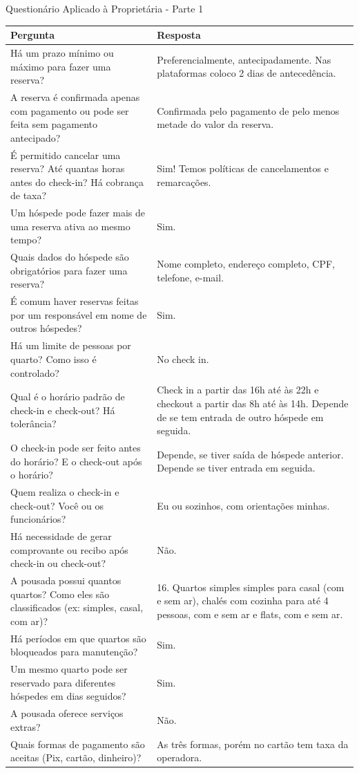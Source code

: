\documentclass[
	12pt,				%
	openany,			%
	twoside,			%
	a4paper,			%
	english,			%
	french,				%
	spanish,			%
	brazil				%
	]{abntex2}
\begin{document}
\begin{quadro}[H]
	\caption{Questionário Aplicado à Proprietária - Parte 1}
	 \label{questionario_1}
	  \begin{tabular}{|p{7.5cm}|p{7.5cm}|}
		\hline
		\textbf{Pergunta} & \textbf{Resposta}  \\ \hline
		Há um prazo mínimo ou máximo para fazer uma reserva? & Preferencialmente, antecipadamente. Nas plataformas coloco 2 dias de antecedência. 
		\\ \hline
		A reserva é confirmada apenas com pagamento ou pode ser feita sem pagamento antecipado? &
		Confirmada pelo pagamento de pelo menos metade do valor da reserva.
		\\ \hline
		É permitido cancelar uma reserva? Até quantas horas antes do check-in? Há cobrança de taxa? &
		Sim!  Temos políticas de cancelamentos e remarcações.
		\\ \hline
		Um hóspede pode fazer mais de uma reserva ativa ao mesmo tempo? &	Sim.
		\\ \hline
		Quais dados do hóspede são obrigatórios para fazer uma reserva? &
		Nome completo, endereço completo,  CPF, telefone, e-mail.
		\\ \hline
		É comum haver reservas feitas por um responsável em nome de outros hóspedes? &
		Sim.
		\\ \hline
		Há um limite de pessoas por quarto? Como isso é controlado? & No check in.
		\\ \hline
		Qual é o horário padrão de check-in e check-out? Há tolerância? &
		Check in a partir das 16h até às 22h e checkout a partir das 8h até às 14h.  Depende de se tem entrada de outro hóspede em seguida.
		\\ \hline
		O check-in pode ser feito antes do horário? E o check-out após o horário? &
		Depende, se tiver saída de hóspede anterior.  Depende se tiver entrada em seguida.
		\\ \hline
		Quem realiza o check-in e check-out? Você ou os funcionários? &
		Eu ou sozinhos, com orientações minhas. 
		\\ \hline
		Há necessidade de gerar comprovante ou recibo após check-in ou check-out? &
		Não.
		\\ \hline
		A pousada possui quantos quartos? Como eles são classificados (ex: simples, casal, com ar)? &
		16. Quartos simples simples para casal (com e sem ar), chalés com cozinha para até 4 pessoas, com e sem ar e flats, com e sem ar. 
		\\ \hline
		Há períodos em que quartos são bloqueados para manutenção? &
		Sim.
		\\ \hline
		Um mesmo quarto pode ser reservado para diferentes hóspedes em dias seguidos? &
		Sim.
		\\ \hline
		A pousada oferece serviços extras? &
		Não. 
		\\ \hline
		Quais formas de pagamento são aceitas (Pix, cartão, dinheiro)? &
		As três formas, porém no cartão tem taxa da operadora. 
		\\ \hline
\end{tabular}
\end{quadro}
\end{document}
